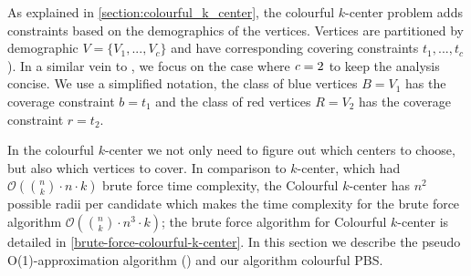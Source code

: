 As explained in \cref{section:colourful_k_center}, the colourful $k$-center problem adds constraints based on the demographics of the vertices. Vertices are partitioned by demographic $V=\{V_1,...,V_c\}$ and have corresponding covering constraints $t_1,...,t_c$). In a similar vein to \textcite{bandyapadhyay_constant_2019}, we focus on the case where $\emph{c}=2$ to keep the analysis concise. We use a simplified notation, the class of blue vertices $B=V_1$ has the coverage constraint $b=t_1$ and the class of red vertices $R=V_2$ has the coverage constraint $r=t_2$. 

In the colourful $k$-center we not only need to figure out which centers to choose, but also which vertices to cover. In comparison to $k$-center, which had $\mathcal{O}(\binom{n}{k}\cdot n\cdot k)$ brute force time complexity, the Colourful $k$-center has $n^2$ possible radii per candidate which makes the time complexity for the brute force algorithm $\mathcal{O}(\binom{n}{k}\cdot n^3\cdot k)$; the brute force algorithm for Colourful $k$-center is detailed in \cref{brute-force-colourful-k-center}. In this section we describe the pseudo O(1)-approximation algorithm (\cite{bandyapadhyay_constant_2019}) and our algorithm colourful PBS.
